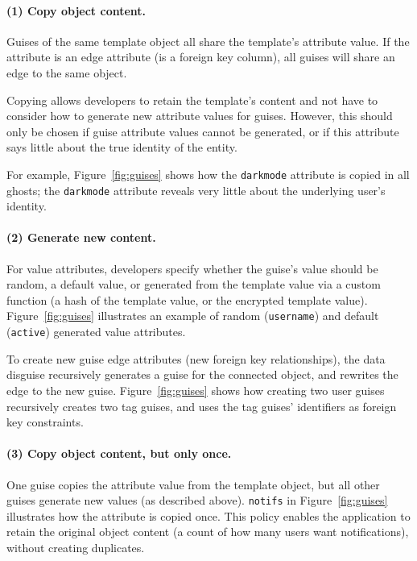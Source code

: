 \paragraph{(1) Copy object content.} Guises of the same template object all share the template's
    attribute value. If the attribute is an edge attribute (\eg is a foreign key column),
    all guises will share an edge to the same object.

    Copying allows developers to retain the template's content and not have to
    consider how to generate new attribute values for guises. However,
    this should only be chosen if guise attribute values cannot be generated, or if this
    attribute says little about the true identity of the entity.

    For example, Figure~\ref{fig:guises} shows how the \texttt{darkmode} attribute is copied in
    all ghosts; the \texttt{darkmode} attribute reveals very little about the underlying user's
    identity.

\paragraph{(2) Generate new content.}
        For value attributes, developers specify whether the guise's value should be random,
        a default value, or generated from the template value via a custom function (\eg a hash of
        the template value, or the encrypted template value). Figure~\ref{fig:guises} illustrates
        an example of random (\texttt{username}) and default (\texttt{active}) generated value attributes.

        To create new guise edge attributes (\eg new foreign key relationships), the data disguise
        recursively generates a guise for the connected object, and rewrites the edge to the new
        guise.  Figure~\ref{fig:guises} shows how creating two user guises recursively creates two
        tag guises, and uses the tag guises' identifiers as foreign key constraints.

\paragraph{(3) Copy object content, but only once.} One guise copies the attribute value from the
template object, but all other guises generate new values (as described above).  \texttt{notifs} in
Figure~\ref{fig:guises} illustrates how the attribute is copied once. This policy enables the
application to retain the original object content (\eg a count of how many users want
notifications), without \eg creating duplicates.

